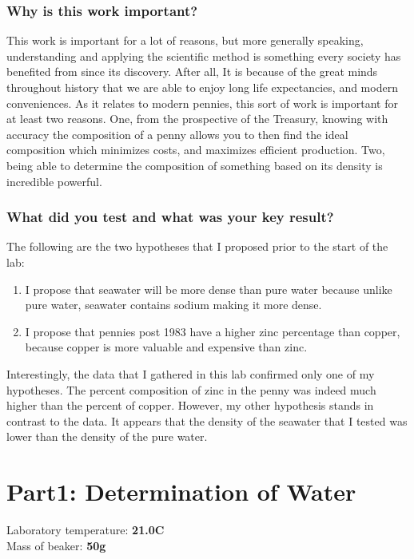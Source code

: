 \documentclass[a4paper,10pt]{article}
\begin{document}
    \subsubsection*{Why is this work important?}
    
      This work is important for a lot of reasons, but more generally speaking, understanding and applying the scientific method is something every society has benefited from since its discovery. After all, It is because of the great minds throughout history that we are able to enjoy long life expectancies, and modern conveniences. As it relates to modern pennies, this sort of work is important for at least two reasons. One, from the prospective of the Treasury, knowing with accuracy the composition of a penny allows you to then find the ideal composition which minimizes costs, and maximizes efficient production. Two, being able to determine the composition of something based on its density is incredible powerful. 
    \subsubsection*{What did you test and what was your key result?}

      The following are the two hypotheses that I proposed prior to the start of the lab:
      
      \begin{enumerate}
        \item I propose that seawater will be more dense than pure water because unlike pure water, seawater contains sodium making it more dense. 
        \item I propose that pennies post 1983 have a higher zinc percentage than copper, because copper is more valuable and expensive than zinc. 
      \end{enumerate} 
      
      Interestingly, the data that I gathered in this lab confirmed only one of my hypotheses. The percent composition of zinc in the penny was indeed much higher than the percent of copper. However, my other hypothesis stands in contrast to the data. It appears that the density of the seawater that I tested was lower than the density of the pure water.  
    
      \section{Part1: Determination of Water}

    Laboratory temperature: \textbf{21.0\degree C}\\
    Mass of beaker: \textbf{50g}
\end{document}
